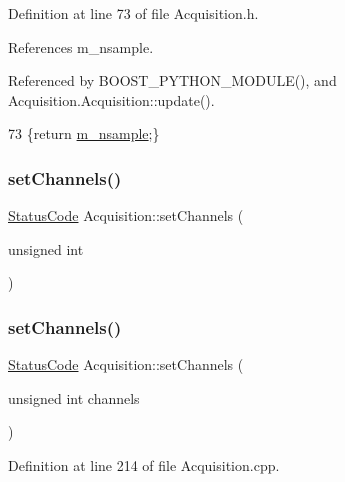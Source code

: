 Definition at line 73 of file Acquisition.\+h.



References m\+\_\+nsample.



Referenced by B\+O\+O\+S\+T\+\_\+\+P\+Y\+T\+H\+O\+N\+\_\+\+M\+O\+D\+U\+L\+E(), and Acquisition.\+Acquisition\+::update().


\begin{DoxyCode}
73 \{\textcolor{keywordflow}{return} \hyperlink{classAcquisition_a26d0f1a44309ffac49c365b7ee568ab2}{m\_nsample};\}
\end{DoxyCode}
\mbox{\label{classAcquisition_a3ee93f665573b4622bd9cba92c0cc04e}} 
\subsubsection{\texorpdfstring{set\+Channels()}{setChannels()}\hspace{0.1cm}{\footnotesize\ttfamily [1/2]}}
{\footnotesize\ttfamily \hyperlink{classStatusCode}{Status\+Code} Acquisition\+::set\+Channels (\begin{DoxyParamCaption}\item[{unsigned}]{int }\end{DoxyParamCaption})}

\mbox{\label{classAcquisition_a3ee93f665573b4622bd9cba92c0cc04e}} 
\subsubsection{\texorpdfstring{set\+Channels()}{setChannels()}\hspace{0.1cm}{\footnotesize\ttfamily [2/2]}}
{\footnotesize\ttfamily \hyperlink{classStatusCode}{Status\+Code} Acquisition\+::set\+Channels (\begin{DoxyParamCaption}\item[{unsigned int}]{channels }\end{DoxyParamCaption})}



Definition at line 214 of file Acquisition.\+cpp.



